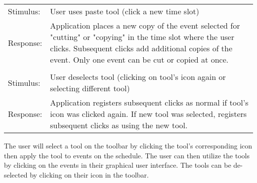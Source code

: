 \documentclass{scrreprt}
\begin{document}
\begin{center}
\begin{tabular}{ p{2cm} p{13cm} }
    Stimulus: & User uses paste tool (click a new time slot)\\
    Response: & Application places a new copy of the event selected for "cutting" or "copying"
    in the time slot where the user clicks. Subsequent clicks add additional copies of the
    event. Only one event can be cut or copied at once.\\
    \\
    Stimulus: & User deselects tool (clicking on tool's icon again or selecting different tool)\\
    Response: & Application registers subsequent clicks as normal if tool's icon
    was clicked again. If new tool was selected, registers subsequent clicks as
    using the new tool.
    \end{tabular}
\end{center}
The user will select a tool on the toolbar by clicking the tool's corresponding icon
then apply the tool to events on the schedule. The user can then utilize the tools
by clicking on the events in their graphical user interface. The tools can be de-selected
by clicking on their icon in the toolbar.
\end{document}
